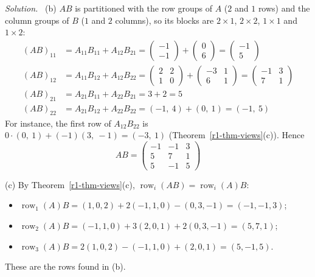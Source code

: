 \documentclass[12pt]{article}
\DeclareMathOperator{\row}{row}
\theoremstyle{definition}
\newenvironment{solution}{\par\noindent\textit{Solution.}\ }{\par\smallskip}
\begin{document}
\begin{solution}
(b) \(AB\) is partitioned with the row groups of \(A\) (\(2\) and \(1\) rows) and the column groups of \(B\) (\(1\) and \(2\)
columns), so its blocks are \(2\times1\), \(2\times2\), \(1\times1\) and \(1\times2\):
\[
\begin{aligned}
(AB)_{11}&=A_{11}B_{11}+A_{12}B_{21}=\begin{pmatrix}-1\\-1\end{pmatrix}+\begin{pmatrix}0\\6\end{pmatrix}=\begin{pmatrix}-1\\5\end{pmatrix}\\
(AB)_{12}&=A_{11}B_{12}+A_{12}B_{22}=\begin{pmatrix}2&2\\1&0\end{pmatrix}+\begin{pmatrix}-3&1\\6&1\end{pmatrix}=\begin{pmatrix}-1&3\\7&1\end{pmatrix}\\
(AB)_{21}&=A_{21}B_{11}+A_{22}B_{21}=3+2=5\\
(AB)_{22}&=A_{21}B_{12}+A_{22}B_{22}=(-1,\ 4)+(0,\ 1)=(-1,\ 5)
\end{aligned}
\]
For instance, the first row of \(A_{12}B_{22}\) is \(0\cdot(0,\ 1)+(-1)(3,\ -1)=(-3,\ 1)\) (Theorem~\ref{r1-thm-views}(c)).
Hence
\[
AB=\left(\begin{array}{c|cc}-1&-1&3\\5&7&1\\\hline5&-1&5\end{array}\right)
\]

(c) By Theorem~\ref{r1-thm-views}(c), \(\row_i(AB)=\row_i(A)B\):
\begin{itemize}
\item \(\row_1(A)B=(1,0,2)+2(-1,1,0)-(0,3,-1)=(-1,-1,3)\);
\item \(\row_2(A)B=(-1,1,0)+3(2,0,1)+2(0,3,-1)=(5,7,1)\);
\item \(\row_3(A)B=2(1,0,2)-(-1,1,0)+(2,0,1)=(5,-1,5)\).
\end{itemize}
These are the rows found in (b).
\end{solution}
\end{document}
